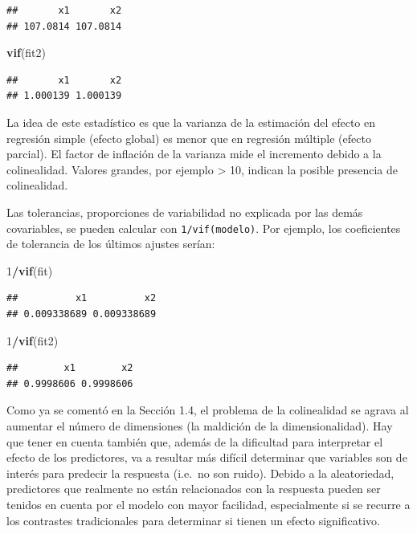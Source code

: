 \documentclass[
  spanish,
]{book}
\newenvironment{Shaded}{\begin{snugshade}}{\end{snugshade}}
\newcommand{\DecValTok}[1]{\textcolor[rgb]{0.00,0.00,0.81}{#1}}
\newcommand{\KeywordTok}[1]{\textcolor[rgb]{0.13,0.29,0.53}{\textbf{#1}}}
\newcommand{\NormalTok}[1]{#1}
\newcommand{\OperatorTok}[1]{\textcolor[rgb]{0.81,0.36,0.00}{\textbf{#1}}}
\theoremstyle{break}
\theoremstyle{definition}
\theoremstyle{definition}
\theoremstyle{definition}
\theoremstyle{remark}
\begin{document}
\begin{verbatim}
##       x1       x2 
## 107.0814 107.0814
\end{verbatim}

\begin{Shaded}
\begin{Highlighting}[]
\KeywordTok{vif}\NormalTok{(fit2) }
\end{Highlighting}
\end{Shaded}

\begin{verbatim}
##       x1       x2 
## 1.000139 1.000139
\end{verbatim}

La idea de este estadístico es que la varianza de la estimación del efecto en
regresión simple (efecto global) es menor que en regresión múltiple (efecto parcial).
El factor de inflación de la varianza mide el incremento debido a la colinealidad.
Valores grandes, por ejemplo \textgreater{} 10, indican la posible presencia de colinealidad.

Las tolerancias, proporciones de variabilidad no explicada por las demás covariables, se pueden calcular con \texttt{1/vif(modelo)}.
Por ejemplo, los coeficientes de tolerancia de los últimos ajustes serían:

\begin{Shaded}
\begin{Highlighting}[]
\DecValTok{1}\OperatorTok{/}\KeywordTok{vif}\NormalTok{(fit)}
\end{Highlighting}
\end{Shaded}

\begin{verbatim}
##          x1          x2 
## 0.009338689 0.009338689
\end{verbatim}

\begin{Shaded}
\begin{Highlighting}[]
\DecValTok{1}\OperatorTok{/}\KeywordTok{vif}\NormalTok{(fit2) }
\end{Highlighting}
\end{Shaded}

\begin{verbatim}
##        x1        x2 
## 0.9998606 0.9998606
\end{verbatim}

Como ya se comentó en la Sección 1.4, el problema de la colinealidad se agrava al aumentar el número de dimensiones (la maldición de la dimensionalidad).
Hay que tener en cuenta también que, además de la dificultad para interpretar el efecto de los predictores, va a resultar más difícil determinar que variables son de interés para predecir la respuesta (i.e.~no son ruido). Debido a la aleatoriedad, predictores que realmente no están relacionados con la respuesta pueden ser tenidos en cuenta por el modelo con mayor facilidad, especialmente si se recurre a los contrastes tradicionales para determinar si tienen un efecto significativo.
\end{document}
